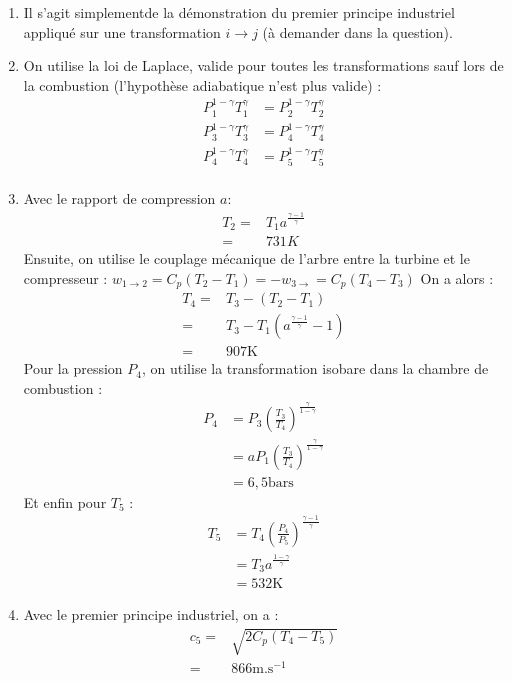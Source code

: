 \begin{correction}

\begin{enumerate}

	\item Il s'agit simplementde la démonstration du premier principe industriel appliqué sur une transformation $i\rightarrow j$ (à demander dans la question).
	
	\item On utilise la loi de Laplace, valide pour toutes les transformations sauf lors de la combustion (l'hypothèse adiabatique n'est plus valide) :
	\begin{align*}
		P_1^{1-\gamma}T_1^\gamma&=P_2^{1-\gamma}T_2^\gamma \\
		P_3^{1-\gamma}T_3^\gamma&=P_4^{1-\gamma}T_4^\gamma \\
		P_4^{1-\gamma}T_4^\gamma&=P_5^{1-\gamma}T_5^\gamma \\
	\end{align*}
	
	\item Avec le rapport de compression $a$: 
	\begin{align*}
		T_2=&T_1a^{\frac{\gamma-1}{\gamma}} \\
		=&731K
	\end{align*}
	Ensuite, on utilise le couplage mécanique de l'arbre entre la turbine et le compresseur : $w_{1\rightarrow2}=C_p(T_2-T_1) =-w_{3\rightarrow}=C_p(T_4-T_3)$
	On a alors :
	\begin{align*}
		T_4=& T_3-(T_2-T_1)\\
		=& T_3-T_1\left(a^\frac{\gamma-1}{\gamma}-1 \right) \\
		=&907\mathrm{K}
	\end{align*}
	Pour la pression $P_4$, on utilise la transformation isobare dans la chambre de combustion :
	\begin{align*}
		P_4&=P_3\left(\frac{T_3}{T_4} \right)^\frac{\gamma}{1-\gamma}\\
		&=aP_1\left(\frac{T_3}{T_4} \right)^\frac{\gamma}{1-\gamma} \\
		&=6,5 \mathrm{bars}
	\end{align*}
	Et enfin pour $T_5$ :
	\begin{align*}
		T_5&=T_4\left(\frac{P_4}{P_5} \right) ^{\frac{\gamma-1}{\gamma}} \\
		&=T_3a^{\frac{1-\gamma}{\gamma}}\\
		&=532\mathrm{K}
	\end{align*}
	
	\item Avec le premier principe industriel, on a :
	\begin{align*}
		c_5=&\sqrt{2C_p(T_4-T_5)} \\
		=&866\mathrm{m.s}^{-1}
	\end{align*}
	
	
\end{enumerate}

\end{correction}